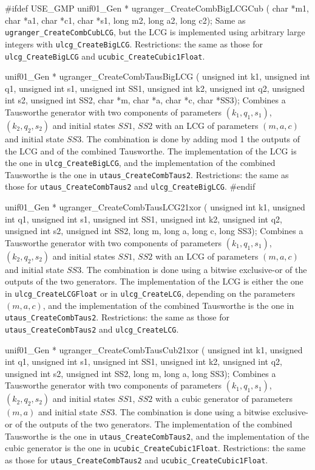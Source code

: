 #ifdef USE_GMP
   unif01_Gen * ugranger_CreateCombBigLCGCub (
      char *m1, char *a1, char *c1, char *s1, long m2, long a2, long c2);
\endcode
 \tab Same as {\tt ugranger\_CreateCombCubLCG}, but the LCG is implemented
   using arbitrary large integers with {\tt ulcg\_CreateBigLCG}.
   Restrictions: the same as those for {\tt ulcg\_CreateBigLCG} and
   {\tt ucubic\_CreateCubic1Float}.
 \endtab
\code


   unif01_Gen * ugranger_CreateCombTausBigLCG (
      unsigned int k1, unsigned int q1, unsigned int s1, unsigned int SS1,
      unsigned int k2, unsigned int q2, unsigned int s2, unsigned int SS2,
      char *m, char *a, char *c, char *SS3);
\endcode
 \tab  Combines a Tausworthe generator with two components of parameters
  $(k_1, q_1, s_1)$, $(k_2, q_2, s_2)$ and
  initial states $\mathit{SS1}$, $\mathit{SS2}$ with an LCG of parameters
  $(m, a, c)$ and initial state $\mathit{SS3}$.
  The combination is done by adding
  mod 1 the outputs of the LCG and of the combined Tausworthe.
  The implementation of the  LCG  is the one in
 {\tt ulcg\_CreateBigLCG}, and the implementation of the
  combined  Tausworthe is the one in {\tt utaus\_CreateCombTaus2}.
  Restrictions:  the same as those for {\tt utaus\_CreateCombTaus2} and
  {\tt ulcg\_CreateBigLCG}.
 \endtab
\code
#endif


unif01_Gen * ugranger_CreateCombTausLCG21xor (
   unsigned int k1, unsigned int q1, unsigned int s1, unsigned int SS1,
   unsigned int k2, unsigned int q2, unsigned int s2, unsigned int SS2,
   long m, long a, long c, long SS3);
\endcode
 \tab  Combines a Tausworthe generator with two components of parameters
  $(k_1, q_1, s_1)$, $(k_2, q_2, s_2)$ and
  initial states $\mathit{SS1}$, $\mathit{SS2}$ with an LCG of parameters
  $(m, a, c)$ and initial state $\mathit{SS3}$.  The combination is done
  using a
  bitwise exclusive-or of the outputs of the two generators.
  The implementation of the  LCG  is either the one in
  {\tt ulcg\_CreateLCGFloat} or in {\tt ulcg\_CreateLCG},
  depending on the parameters $(m, a, c)$, and the implementation of the
  combined  Tausworthe is the one in {\tt utaus\_CreateCombTaus2}.
  Restrictions:  the same as those for {\tt utaus\_CreateCombTaus2} and
  {\tt ulcg\_CreateLCG}.
 \endtab
\code


unif01_Gen * ugranger_CreateCombTausCub21xor (
   unsigned int k1, unsigned int q1, unsigned int s1, unsigned int SS1,
   unsigned int k2, unsigned int q2, unsigned int s2, unsigned int SS2,
   long m, long a, long SS3);
\endcode
 \tab
  Combines a Tausworthe generator  with two components  of parameters
  $(k_1, q_1, s_1)$, $(k_2, q_2, s_2)$  and
  initial states $\mathit{SS1}$, $\mathit{SS2}$  with a  cubic generator of
  parameters $(m, a)$ and  initial state $\mathit{SS3}$.
  The combination is done using a
  bitwise exclusive-or of the outputs of the two generators.
  The implementation of the
  combined  Tausworthe is the one in {\tt utaus\_CreateCombTaus2},
  and the implementation of the cubic generator
  is the one in {\tt ucubic\_CreateCubic1Float}.
  Restrictions: the same as those for  {\tt utaus\_CreateCombTaus2} and
  {\tt ucubic\_CreateCubic1Float}.
 \endtab
\code


